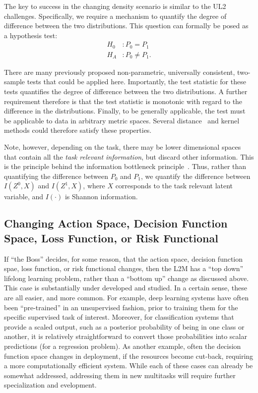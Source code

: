 \documentclass{article}
\begin{document}
The key to success in the changing density scenario is similar to the UL2 challenges.  Specifically, we require a mechanism to quantify the degree of difference between the two distributions.  This question can formally be posed as a hypothesis test:
\begin{align*}
    H_0 &: P_0 = P_1 \\
    H_A &: P_0 \neq P_1.
\end{align*}

There are many previously proposed non-parametric, universally consistent,  two-sample tests that could be applied here.  Importantly, the test statistic for these tests quantifies the degree of difference between the two distributions.  A further requirement therefore is that the test statistic is monotonic with regard to the difference in the distributions.  Finally, to be generally applicable, the test must be applicable to data in arbitrary metric spaces.  Several distance~\cite{Rizzo2010-vr} and kernel~\cite{Gretton2012-ue} methods could therefore satisfy these properties. 

Note, however, depending on the task, there may be lower dimensional spaces that contain all the \emph{task relevant information}, but discard other information.  This is the principle behind the information bottleneck principle~\cite{Tishby1999-tj}.  Thus, rather than quantifying the difference between $P_0$ and $P_1$, we quantify the difference between $I(Z^0,X)$ and $I(Z^1,X)$, where $X$ corresponds to the task relevant latent variable, and $I(\cdot)$ is Shannon information. 



\subsection{Changing Action Space, Decision Function Space, Loss Function, or Risk Functional}

If ``the Boss'' decides, for some reason, that the action space, decision function spae, loss function, or risk functional changes, then the L2M has a ``top down'' lifelong learning problem, rather than a ``bottom up'' change as discussed above.  This case is substantially under developed and studied.  In a certain sense, these are all easier, and more common.  For example, deep learning systems have often been ``pre-trained'' in an unsupervised fashion, prior to training them for the specific supervised task of interest. Moreover, for classification systems that provide a scaled output, such as a posterior probability of being in one class or another, it is relatively straightforward to convert those probabilities into scalar predictions (for a regression problem).  As another example, often the decision function space changes in deployment, if the resources become cut-back, requiring a more computationally efficient system.  While each of these cases can already be somewhat addressed,  addressing them in new multitasks will require further specialization and evelopment. 
\end{document}

